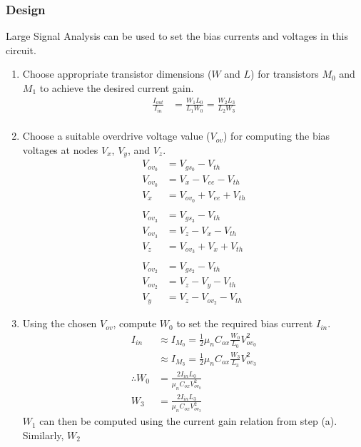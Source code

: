 \subsubsection{Design}
Large Signal Analysis can be used to set the bias
currents and voltages in this circuit.
\begin{enumerate}
  \item Choose appropriate transistor dimensions
    ($W$ and $L$) for transistors $M_0$ and $M_1$
    to achieve the desired current gain.
    \begin{align*}
      \frac{I_{out}}{I_{in}} &= \frac{W_1 L_0}{L_1 W_0} = \frac{W_2 L_3}{L_2 W_3} \\
    \end{align*}
  \item Choose a suitable overdrive voltage value
    ($V_{ov}$) for computing the bias voltages at
    nodes $V_{x}$, $V_{y}$, and $V_{z}$.
    \begin{align*}
      V_{ov_0} &= V_{gs_0} - V_{th} \\
      V_{ov_0} &= V_{x} - V_{ee} - V_{th} \\
      V_{x} &= V_{ov_0} + V_{ee} + V_{th} \\
      \\
      V_{ov_3} &= V_{gs_3} - V_{th} \\
      V_{ov_3} &= V_{z} - V_{x} - V_{th} \\
      V_{z} &= V_{ov_3} + V_{x} + V_{th} \\
      \\
      V_{ov_2} &= V_{gs_2} - V_{th} \\
      V_{ov_2} &= V_{z} - V_{y} - V_{th} \\
      V_{y} &= V_{z} - V_{ov_2} - V_{th}
    \end{align*}
  \item Using the chosen $V_{ov}$, compute $W_0$
    to set the required bias current $I_{in}$.
    \begin{align*}
      I_{in} &\approx I_{M_0} = \frac{1}{2} \mu_n C_{ox} \frac{W_0}{L_0} V_{ov_0}^2 \\
             &\approx I_{M_3} = \frac{1}{2} \mu_n C_{ox} \frac{W_3}{L_3} V_{ov_3}^2 \\
      \therefore W_0 &= \frac{2 I_{in} L_0}{\mu_n C_{ox} V_{ov_0}^2} \\
                 W_3 &= \frac{2 I_{in} L_3}{\mu_n C_{ox} V_{ov_3}^2}
    \end{align*}
    $W_1$ can then be computed using the current
    gain relation from step (a). Similarly, $W_2$

\end{enumerate}
